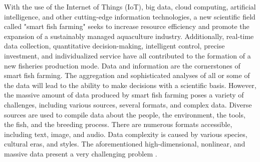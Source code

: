 With the use of the Internet of Things (IoT), big data, cloud computing, artificial intelligence, and other cutting-edge information technologies, a new scientific field called "smart fish farming" seeks to increase resource efficiency and promote the expansion of a sustainably managed aquaculture industry. Additionally, real-time data collection, quantitative decision-making, intelligent control, precise investment, and individualized service have all contributed to the formation of a new fisheries production mode. Data and information are the cornerstones of smart fish farming. The aggregation and sophisticated analyses of all or some of the data will lead to the ability to make decisions with a scientific basis. However, the massive amount of data produced by smart fish farming poses a variety of challenges, including various sources, several formats, and complex data. Diverse sources are used to compile data about the people, the environment, the tools, the fish, and the breeding process. There are numerous formats accessible, including text, image, and audio. Data complexity is caused by various species, cultural eras, and styles. The aforementioned high-dimensional, nonlinear, and massive data present a very challenging problem \cite{yang2021deep}. \\


